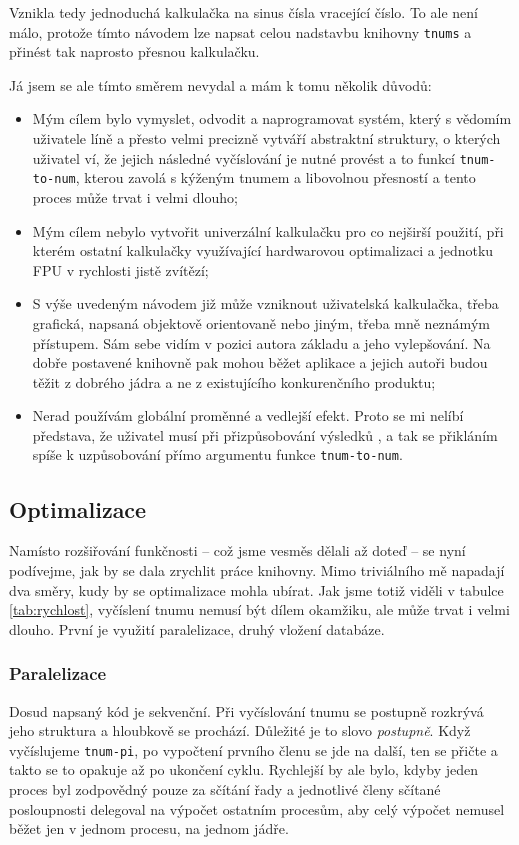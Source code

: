 Vznikla tedy jednoduchá kalkulačka na sinus čísla vracející číslo. To ale není málo, protože tímto návodem lze napsat celou nadstavbu knihovny \texttt{tnums} a přinést tak naprosto přesnou kalkulačku.

Já jsem se ale tímto směrem nevydal a mám k tomu několik důvodů:
\begin{itemize}
\item{Mým cílem bylo vymyslet, odvodit a naprogramovat systém, který s vědomím uživatele líně a přesto velmi precizně vytváří abstraktní struktury, o kterých uživatel ví, že jejich následné vyčíslování je nutné provést a to funkcí \texttt{tnum-to-num}, kterou zavolá s kýženým tnumem a libovolnou přesností a tento proces může trvat i velmi dlouho;}
\item{Mým cílem nebylo vytvořit univerzální kalkulačku pro co nejširší použití, při kterém ostatní kalkulačky využívající hardwarovou optimalizaci a jednotku FPU v rychlosti jistě zvítězí;}
\item{S výše uvedeným návodem již může vzniknout uživatelská kalkulačka, třeba grafická, napsaná objektově orientovaně nebo jiným, třeba mně neznámým přístupem. Sám sebe vidím v pozici autora základu a jeho vylepšování. Na dobře postavené knihovně pak mohou běžet aplikace a jejich autoři budou těžit z dobrého jádra a ne z existujícího konkurenčního produktu;}
\item{Nerad používám globální proměnné a vedlejší efekt. Proto se mi nelíbí představa, že uživatel musí při přizpůsobování výsledků , a tak se přikláním spíše k uzpůsobování přímo argumentu funkce \texttt{tnum-to-num}.}
\end{itemize}

\subsection{Optimalizace}
Namísto rozšiřování funkčnosti -- což jsme vesměs dělali až doteď -- se nyní podívejme, jak by se dala zrychlit práce knihovny. Mimo triviálního  mě napadají dva směry, kudy by se optimalizace mohla ubírat. Jak jsme totiž viděli v tabulce \ref{tab:rychlost}, vyčíslení tnumu nemusí být dílem okamžiku, ale může trvat i velmi dlouho. První je využití paralelizace, druhý vložení databáze.

\subsubsection{Paralelizace}
Dosud napsaný kód je sekvenční. Při vyčíslování tnumu se postupně rozkrývá jeho struktura a hloubkově se prochází. Důležité je to slovo \textit{postupně}. Když vyčíslujeme \texttt{tnum-pi}, po vypočtení prvního členu se jde na další, ten se přičte a takto se to opakuje až po ukončení cyklu. Rychlejší by ale bylo, kdyby jeden proces byl zodpovědný pouze za sčítání řady a jednotlivé členy sčítané posloupnosti delegoval na výpočet ostatním procesům, aby celý výpočet nemusel běžet jen v jednom procesu, na jednom jádře.

